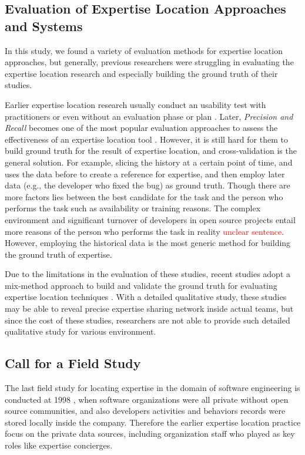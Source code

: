 \subsection{Evaluation of Expertise Location Approaches and Systems}

In this study, we found a variety of evaluation methods for expertise location approaches, but generally, previous researchers were struggling in evaluating the expertise location research and especially building the ground truth of their studies.

Earlier expertise location research usually conduct an usability test with practitioners \cite{mockus2002expertise} or even without an evaluation phase or plan \cite{nardi2002integrating, mcdonald2000expertise}. Later, \textit{Precision and Recall} becomes one of the most popular evaluation approaches to assess the effectiveness of an expertise location tool \cite{Anvik2006who, xu2016predicting, yu2016reviewer}. However, it is still hard for them to build ground truth for the result of expertise location, and cross-validation is the general solution. For example, slicing the history at a certain point of time, and uses the data before to create a reference for expertise, and then employ later data (e.g., the developer who fixed the bug) as ground truth. Though there are more factors lies between the best candidate for the task and the person who performs the task such as availability or training reasons. The complex environment and significant turnover of developers in open source projects entail more reasons of the person who performs the task in reality \textcolor{red}{unclear sentence}. However, employing the historical data is the most generic method for building the ground truth of expertise.

Due to the limitations in the evaluation of these studies, recent studies adopt a mix-method approach to build and validate the ground truth for evaluating expertise location techniques \cite{yu2016reviewer, costa2016tipmerge, xu2016predicting}. With a detailed qualitative study, these studies may be able to reveal precise expertise sharing network inside actual teams, but since the cost of these studies, researchers are not able to provide such detailed qualitative study for various environment.

\subsection{Call for a Field Study}

The last field study for locating expertise in the domain of software engineering is conducted at 1998 \cite{mcdonald1998just}, when software organizations were all private without open source communities, and also developers activities and behaviors records were stored locally inside the company. Therefore the earlier expertise location practice focus on the private data sources, including organization staff who played as key roles like expertise concierges.


